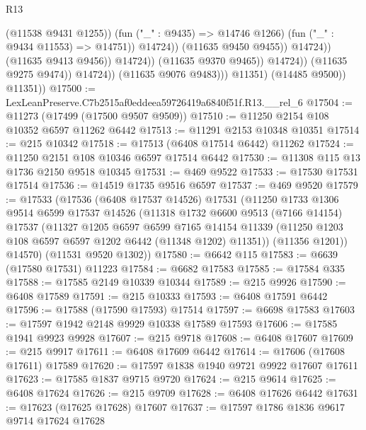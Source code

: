 \begin{lexlean}{R13}
\begin{coremodule}
                                                (@11538 @9431 @1255))
                                              (fun ("_" : @9435) => @14746 @1266)
                                              (fun ("_" : @9434 @11553) => @14751))
                                            @14724))
                                        (@11635 @9450 @9455))
                                      @14724))
                                  (@11635 @9413 @9456))
                                @14724))
                            (@11635 @9370 @9465))
                          @14724))
                      (@11635 @9275 @9474))
                    @14724))
                (@11635 @9076 @9483)))
            @11351)
          (@14485 @9500))
        @11351))
@17500 := LexLeanPreserve.C7b2515af0eddeea59726419a6840f51f.R13.__rel_6
@17504 := @11273 (@17499 (@17500 @9507 @9509))
@17510 := @11250 @2154 @108 @10352 @6597 @11262 @6442
@17513 := @11291 @2153 @10348 @10351
@17514 := @215 @10342
@17518 := @17513 (@6408 @17514 @6442) @11262
@17524 := @11250 @2151 @108 @10346 @6597 @17514 @6442
@17530 := @11308 @115 @13 @1736 @2150 @9518 @10345
@17531 := @469 @9522
@17533 := @17530 @17531 @17514
@17536 := @14519 @1735 @9516 @6597
@17537 := @469 @9520
@17579 := @17533
    (@17536
      (@6408 @17537 @14526)
      @17531
      (@11250
        @1733
        @1306
        @9514
        @6599
        @17537
        @14526
        (@11318
          @1732
          @6600
          @9513
          (@7166 @14154)
          @17537
          (@11327
            @1205
            @6597
            @6599
            @7165
            @14154
            @11339
            (@11250 @1203 @108 @6597 @6597 @1202 @6442 (@11348 @1202) @11351))
          (@11356 @1201))
        @14570)
      (@11531 @9520 @1302))
@17580 := @6642 @115
@17583 := @6639 (@17580 @17531) @11223
@17584 := @6682 @17583
@17585 := @17584 @335
@17588 := @17585 @2149 @10339 @10344
@17589 := @215 @9926
@17590 := @6408 @17589
@17591 := @215 @10333
@17593 := @6408 @17591 @6442
@17596 := @17588 (@17590 @17593) @17514
@17597 := @6698 @17583
@17603 := @17597 @1942 @2148 @9929 @10338 @17589 @17593
@17606 := @17585 @1941 @9923 @9928
@17607 := @215 @9718
@17608 := @6408 @17607
@17609 := @215 @9917
@17611 := @6408 @17609 @6442
@17614 := @17606 (@17608 @17611) @17589
@17620 := @17597 @1838 @1940 @9721 @9922 @17607 @17611
@17623 := @17585 @1837 @9715 @9720
@17624 := @215 @9614
@17625 := @6408 @17624
@17626 := @215 @9709
@17628 := @6408 @17626 @6442
@17631 := @17623 (@17625 @17628) @17607
@17637 := @17597 @1786 @1836 @9617 @9714 @17624 @17628

\end{coremodule}
\end{lexlean}
